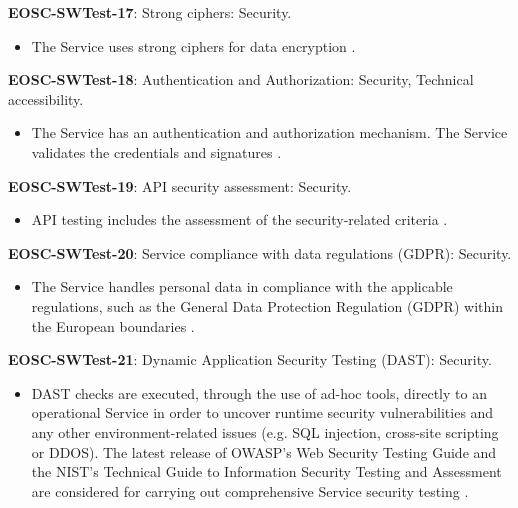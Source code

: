 \textbf{EOSC-SWTest-17}: Strong ciphers: Security.

\begin{itemize}
    \item The Service uses strong ciphers for data encryption \cite{orviz_fernandez_eosc-synergy_2020}.
\end{itemize}

\textbf{EOSC-SWTest-18}: Authentication and Authorization: Security, Technical accessibility.

\begin{itemize}
    \item The Service has an authentication and authorization mechanism. The Service validates the credentials and signatures \cite{shepherdson_cessda_2019,orviz_fernandez_eosc-synergy_2020}.
\end{itemize}

\textbf{EOSC-SWTest-19}: API security assessment: Security.

\begin{itemize}
    \item API testing includes the assessment of the security-related criteria \cite{orviz_fernandez_eosc-synergy_2020}.
\end{itemize}

\textbf{EOSC-SWTest-20}: Service compliance with data regulations (GDPR): Security.

\begin{itemize}
    \item The Service handles personal data in compliance with the applicable regulations, such as the General Data Protection Regulation (GDPR) within the European boundaries \cite{orviz_fernandez_eosc-synergy_2020}.
\end{itemize}

\textbf{EOSC-SWTest-21}: Dynamic Application Security Testing (DAST): Security.

\begin{itemize}
    \item DAST checks are executed, through the use of ad-hoc tools, directly to an operational Service in order to uncover runtime security vulnerabilities and any other environment-related issues (e.g. SQL injection, cross-site scripting or DDOS). The latest release of OWASP's Web Security Testing Guide and the NIST's Technical Guide to Information Security Testing and Assessment are considered for carrying out comprehensive Service security testing \cite{orviz_fernandez_eosc-synergy_2020}.
\end{itemize}

